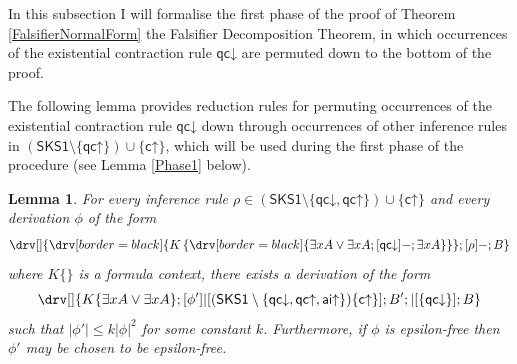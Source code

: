 \documentclass[10pt]{article}
\newtheorem{lemma}[theorem]{Lemma}
\theoremstyle{definition}\newtheorem{remark}[theorem]{Remark}
\theoremstyle{definition}\newtheorem{example}[theorem]{Example}
\theoremstyle{definition}\newtheorem{definition}[theorem]{Definition}
\newcommand{\SKSqDecomp}{{\mathsf{SKS1}}}
\newcommand{\aiUp}{{\mathsf{ai\mathord\uparrow}}}
\newcommand{\cUp}{{\mathsf{c\mathord\uparrow}}}
\newcommand{\qcUp}{{\mathsf{qc\mathord\uparrow}}}
\newcommand{\qcDown}{{\mathsf{qc\mathord\downarrow}}}
\begin{document}
	In this subsection I will formalise the first phase of the proof of Theorem \ref{FalsifierNormalForm} the Falsifier Decomposition Theorem, in which occurrences of the existential contraction rule $\qcDown$ are permuted down to the bottom of the proof.
	
	The following lemma provides reduction rules for permuting occurrences of the existential contraction rule $\qcDown$ down through occurrences of other inference rules in $(\SKSqDecomp \setminus \{\qcUp\}) \cup \{\cUp\}$, which will be used during the first phase of the procedure (see Lemma \ref{Phase1} below).
	
	\begin{lemma}\label{Phase1Permutations}
		For every inference rule $\rho \in (\SKSqDecomp \setminus \{\qcDown, \qcUp\}) \cup \{\cUp\}$ and every derivation $\phi$ of the form
		\[
		\drv[] {
			\drv[border=black] {
				K \left\{ \drv[border=black] {
					\exists x A \lor \exists x A ; [\qcDown]- ; \exists x A
				} \right\}
			} ; [\rho]- ; B
		} 
		\]
		where $K \{\}$ is a formula context, there exists a derivation of the form
		\[
		\drv[] {
			K \{\exists x A \lor \exists x A\} ; [\phi']|[(\SKSqDecomp \setminus \{\qcDown, \qcUp, \aiUp\}) \{\cUp\}] ; B' ; |[\{\qcDown\}] ; B
		}
		\]
		such that $|\phi'| \leq k |\phi|^2$ for some constant $k$. Furthermore, if $\phi$ is epsilon-free then $\phi'$ may be chosen to be epsilon-free.
	\end{lemma}
	
\end{document}
